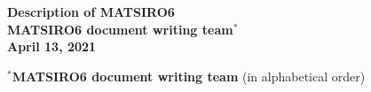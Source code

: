 \documentclass[11pt,a4paper,onecolumn]{article}
\begin{document}
%
\begin{titlepage} %
	\vspace*{\fill}
		\begin{center}
			{\Huge \textbf{Description of MATSIRO6}}\\
			\vspace{100mm}
			{\Large \textbf{MATSIRO6 document writing team$^*$}}\\
			\vspace{30mm}
			{\Large \textbf{April 13, 2021}}
		\end{center}
	\vspace*{\fill}
	$^*${\bf\textbf{MATSIRO6 document writing team}} (in alphabetical order)
	
\end{titlepage}
%
\clearpage

\clearpage

\clearpage

	\tableofcontents
	\clearpage
	\def\tightlist{\itemsep1pt\parskip0pt\parsep0pt}
	


\end{document}
